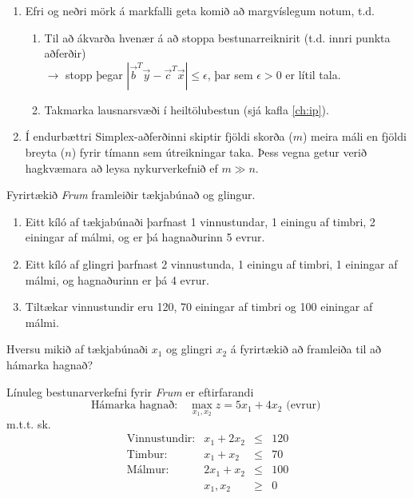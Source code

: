 \begin{samepage}
\begin{aths}\hspace{.1cm}
 \begin{enumerate}
  \item Efri og neðri mörk á markfalli geta komið að margvíslegum notum, t.d.
 \begin{enumerate}[label=(\roman{*})]
  \item Til að ákvarða hvenær á að stoppa bestunarreiknirit (t.d. innri punkta aðferðir)\\
  $\rightarrow$ stopp þegar $\left|\vec{b}^T\vec{y}-\vec{c}^T\vec{x}\right|\leq \epsilon$, þar sem $\epsilon>0$ er lítil tala.
  \item Takmarka lausnarsvæði í heiltölubestun (sjá kafla \ref{ch:ip}).
 \end{enumerate}
 \item Í endurbættri Simplex-aðferðinni skiptir fjöldi skorða ($m$) meira máli en fjöldi breyta ($n$) fyrir tímann sem útreikningar taka. Þess  vegna getur verið hagkvæmara að leysa nykurverkefnið ef $m\gg n$.
 \end{enumerate}
\end{aths}
\end{samepage}
\begin{samepage}
\begin{daemi}\label{daemi:frum}
Fyrirtækið \emph{Frum} framleiðir tækjabúnað og glingur.
\begin{enumerate}
\item Eitt kíló af tækjabúnaði þarfnast 1 vinnustundar, 1 einingu af timbri, 2 einingar af málmi, og er þá hagnaðurinn 5 evrur.
\item Eitt kíló af glingri  þarfnast 2 vinnustunda, 1 einingu af timbri, 1 einingar af málmi, og hagnaðurinn er þá 4 evrur.
\item Tiltækar vinnustundir eru 120, 70 einingar af timbri og 100 einingar af málmi.
\end{enumerate}
Hversu mikið af tækjabúnaði $x_1$ og glingri $x_2$ á fyrirtækið að framleiða til að hámarka hagnað? 
\end{daemi}
\end{samepage}

\begin{lausn}Línuleg bestunarverkefni fyrir \emph{Frum} er eftirfarandi 
$$ \mbox{Hámarka hagnað:} \quad \max_{x_1,x_2} z = 5 x_1 + 4 x_2  \mbox{ (evrur) }  $$
m.t.t. sk. 
\[ \begin{array}{lrcl}
\mbox{Vinnustundir:} & x_1 + 2 x_2 &\le& 120 \\
\mbox{Timbur:} & x_1 + x_2 &\le &70  \\
\mbox{Málmur:}& 2x_1 + x_2 &\le& 100 \\
& x_1, x_2 &\ge& 0 
\end{array}\]
\end{lausn}

